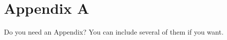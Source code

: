 \appendix
\chapter{Appendix A}

Do you need an Appendix?  You can include several of them if you want.

